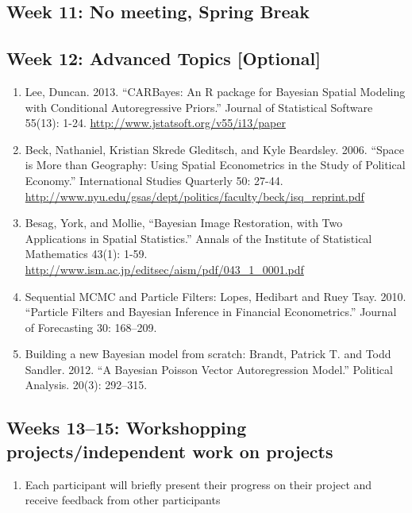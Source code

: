\documentclass[11pt, leqno, fleqn]{article}
\begin{document}
\subsection*{Week 11: No meeting, Spring Break}
\subsection*{Week 12: Advanced Topics [Optional]}
	\begin{enumerate}
	\item[] Lee, Duncan. 2013. ``CARBayes: An R package for Bayesian Spatial Modeling with Conditional Autoregressive Priors.'' Journal of Statistical Software 55(13): 1-24. \url{http://www.jstatsoft.org/v55/i13/paper}
	\item[] Beck, Nathaniel, Kristian Skrede Gleditsch, and Kyle Beardsley. 2006. ``Space is More than Geography: Using Spatial Econometrics in the Study of Political Economy.'' International Studies Quarterly 50: 27-44. \url{http://www.nyu.edu/gsas/dept/politics/faculty/beck/isq_reprint.pdf}
	\item[] Besag, York, and Mollie, ``Bayesian Image Restoration, with Two Applications in Spatial Statistics.'' Annals of the Institute of Statistical Mathematics 43(1): 1-59. \url{http://www.ism.ac.jp/editsec/aism/pdf/043_1_0001.pdf}
	\item[]  Sequential MCMC and Particle Filters: Lopes, Hedibart and Ruey Tsay. 2010. ``Particle Filters and Bayesian Inference in Financial Econometrics.'' Journal of Forecasting 30: 168--209.
	\item[] Building a new Bayesian model from scratch: Brandt, Patrick T. and Todd Sandler. 2012. ``A Bayesian Poisson Vector Autoregression Model.'' Political Analysis. 20(3): 292--315.
	\end{enumerate}
\subsection*{Weeks 13--15: Workshopping projects/independent work on projects}
	\begin{enumerate}
	\item[] Each participant will briefly present their progress on their project and receive feedback from other participants
	\end{enumerate}
\end{document}
